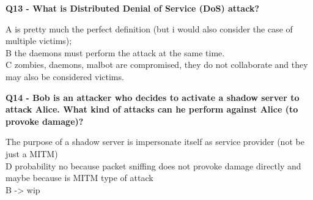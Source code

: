 \textbf{Q13 - What is Distributed Denial of Service (DoS) attack?}
\textcolor{Comment}{A is pretty much the perfect definition (but i would also consider the case of multiple victims); \\
B the daemons must perform the attack at the same time.\\
C zombies, daemons, malbot are compromised, they do not collaborate and they may also be considered victims.}

\textbf{Q14 - Bob is an attacker who decides to activate a shadow server to attack Alice. What kind of attacks can he perform against Alice (to provoke damage)?}
\textcolor{Comment}{The purpose of a shadow server is impersonate itself as service provider (not be just a MITM)\\
D probability no because packet sniffing does not provoke damage directly and maybe because is MITM type of attack  \\
 B -> wip
}



